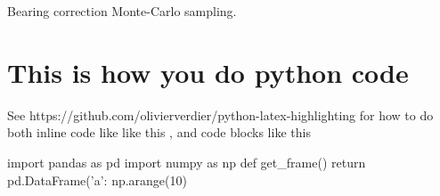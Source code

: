 \documentclass[paper=a4, fontsize=11pt abstract]{scrartcl}
\numberwithin{equation}{section}		%
\numberwithin{figure}{section}			%
\numberwithin{table}{section}				%
\begin{document}
\begin{appendices}
\begin{algorithm}[H]
{ }
 \caption{Bearing correction Monte-Carlo sampling.}
\end{algorithm}

\section{This is how you do python code}
See https://github.com/olivierverdier/python-latex-highlighting
for how to do both inline code like like this , and code blocks like this

\begin{python}
import pandas as pd
import numpy as np
def get_frame()
    return pd.DataFrame({'a': np.arange(10})
\end{python}

\end{appendices}

\printbibliography

\end{document}
